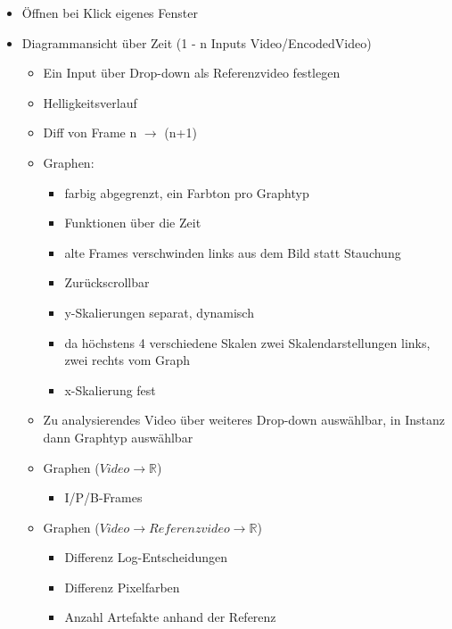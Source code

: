 \documentclass{article}
\begin{document}
    \begin{itemize}
        \item Öffnen bei Klick eigenes Fenster
        \item Diagrammansicht über Zeit (1 - n Inputs Video/EncodedVideo)
            \begin{itemize}
                \item Ein Input über Drop-down als Referenzvideo festlegen
                \item Helligkeitsverlauf
                \item Diff von Frame n $\rightarrow$ (n+1)
                \item Graphen:
                    \begin{itemize}
                        \item farbig abgegrenzt, ein Farbton pro Graphtyp
                        \item Funktionen über die Zeit
                        \item alte Frames verschwinden links aus dem Bild statt Stauchung
                        \item Zurückscrollbar
                        \item y-Skalierungen separat, dynamisch
                        \item da höchstens 4 verschiedene Skalen zwei Skalendarstellungen links, zwei rechts vom Graph
                        \item x-Skalierung fest
                    \end{itemize}
                \item Zu analysierendes Video über weiteres Drop-down auswählbar, in Instanz dann Graphtyp auswählbar
                \item Graphen ($Video \rightarrow \mathbb{R}$)
                    \begin{itemize}
                        \item I/P/B-Frames
                    \end{itemize}
                \item Graphen ($Video \rightarrow Referenzvideo \rightarrow \mathbb{R}$)
                    \begin{itemize}
                        \item Differenz Log-Entscheidungen
                        \item Differenz Pixelfarben
                        \item Anzahl Artefakte anhand der Referenz

\end{itemize}
\end{itemize}
\end{itemize}
\end{document}

